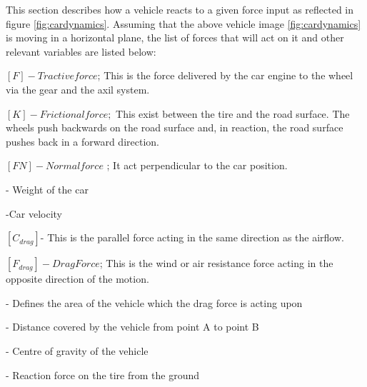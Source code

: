 \documentclass{book}
\begin{document}
This section describes how a vehicle reacts to a given force  input as reflected in figure  \cref{fig:cardynamics}. Assuming that the above vehicle image  \cref{fig:cardynamics}  is moving in a horizontal plane, the list of forces that will act on it and other relevant variables are listed below:
\begin{description}
  \item $[F]-Tractive force$; This is the force delivered by the car engine  to the wheel via the gear and the axil system.
  \item $[K]-Frictional force;$ This exist between the tire and the road surface. The wheels push backwards on the road surface and, in reaction, the road surface pushes back in a forward direction.
  \item $[FN]- Normal force$ ; It act perpendicular to the car position.
  \item[W]- Weight of the car
  \item[V]-Car velocity
  \item$ [C_{drag}] $- This is the parallel force acting in the same direction as the airflow.
  \item $[F_{drag}]-Drag Force $; This is the wind or air resistance force acting in the opposite direction of the motion.
  \item[A]- Defines the area of the vehicle which the drag force is acting upon
  \item[dx]- Distance covered by the vehicle from point A to point B
  \item[Red dot]- Centre of gravity of the vehicle
  \item[R1 and R2]- Reaction force on the tire from the ground
 \end{description}
\end{document}
